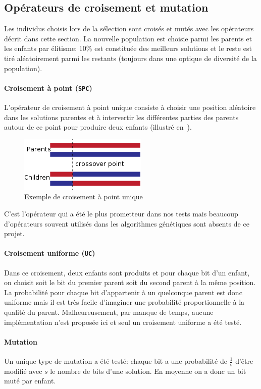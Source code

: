 \documentclass[10pt]{article}
\begin{document}
	\subsection{Opérateurs de croisement et mutation}
		
		Les individus choisis lors de la sélection sont croisés et mutés avec les opérateurs décrit dans cette section. La nouvelle population est choisie parmi les parents et les enfants par élitisme: 10\% est constituée des meilleurs solutions et le reste est tiré aléatoirement parmi les restants (toujours dans une optique de diversité de la population).
		
		\paragraph{Croisement à point (\texttt{SPC})}{
		L'opérateur de croisement à point unique consiste à choisir une position aléatoire dans les solutions parentes et à intervertir les différentes parties des parents autour de ce point pour produire deux enfants (illustré en~).
			\begin{figure}[h!]
				\centering
				\includegraphics[width=0.3\linewidth]{spc.png}
				\caption{Exemple de croisement à point unique}
				\label{fig-spc}
			\end{figure}
			C'est l'opérateur qui a été le plus prometteur dans nos tests mais beaucoup d'opérateurs souvent utilisés dans les algorithmes génétiques sont absents de ce projet.
		}
		\paragraph{Croisement uniforme (\texttt{UC})}{
		Dans ce croisement, deux enfants sont produits et pour chaque bit d'un enfant, on choisit soit le bit du premier parent soit du second parent à la même position. La probabilité pour chaque bit d'appartenir à un quelconque parent est donc uniforme mais il est très facile d'imaginer une probabilité proportionnelle à la qualité du parent. Malheureusement, par manque de temps, aucune implémentation n'est proposée ici et seul un croisement uniforme a été testé.
		}
		\paragraph{Mutation}{
			Un unique type de mutation a été testé: chaque bit a une probabilité de $\frac{1}{\text{s}}$ d'être modifié avec $s$ le nombre de bits d'une solution. En moyenne on a donc un bit muté par enfant.
		}
	
\end{document}
